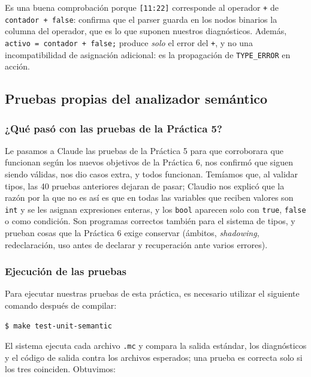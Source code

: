 \documentclass[12pt,letterpaper]{article}
\begin{document}
Es una buena comprobación porque \texttt{[11:22]} corresponde al operador \texttt{+} de
\texttt{contador + false}: confirma que el parser guarda en los nodos binarios la columna del operador, que es
lo que suponen nuestros diagnósticos. Además, \texttt{activo = contador + false;} produce \emph{solo} el error
del \texttt{+}, y no una incompatibilidad de asignación adicional: es la propagación de \texttt{TYPE\_ERROR} en
acción.

\subsection*{Pruebas propias del analizador semántico}

\subsubsection*{¿Qué pasó con las pruebas de la Práctica 5?}

Le pasamos a Claude las pruebas de la Práctica 5 para que corroborara que funcionan según los nuevos objetivos
de la Práctica 6, nos confirmó que siguen siendo válidas, nos dio casos extra, y todos funcionan. Temíamos que,
al validar tipos, las 40 pruebas anteriores dejaran de pasar; Claudio nos explicó que la razón por la que no es
así es que en todas las variables que reciben valores son \texttt{int} y se les asignan expresiones enteras,
y los \texttt{bool} aparecen solo con \texttt{true}, \texttt{false} o como condición. Son programas correctos
también para el sistema de tipos, y prueban cosas que la Práctica 6 exige conservar
(ámbitos, \emph{shadowing}, redeclaración, uso antes de declarar y recuperación ante varios errores).\\

\subsubsection*{Ejecución de las pruebas}

Para ejecutar nuestras pruebas de esta práctica, es necesario utilizar el siguiente comando después de compilar:
\begin{verbatim}
$ make test-unit-semantic
\end{verbatim}

El sistema ejecuta cada archivo \texttt{.mc} y compara la salida estándar, los diagnósticos y el código de
salida contra los archivos esperados; una prueba es correcta solo si los tres coinciden. Obtuvimos:
\end{document}
